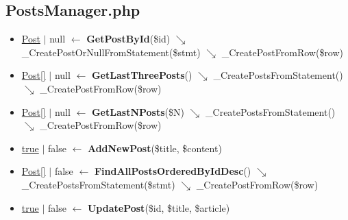 \subsection{PostsManager.php}
\begin{itemize}
  \setlength\itemsep{0em}
  \item \underline{Post} $\vert$ null $\leftarrow$ \textbf{GetPostById}(\$id) $\searrow$ \_CreatePostOrNullFromStatement(\$stmt) $\searrow$ \_CreatePostFromRow(\$row)
  \item \underline{Post[]} $\vert$ null $\leftarrow$ \textbf{GetLastThreePosts}() $\searrow$ \_CreatePostsFromStatement() $\searrow$ \_CreatePostFromRow(\$row)
  \item \underline{Post[]} $\vert$ null $\leftarrow$ \textbf{GetLastNPosts}(\$N) $\searrow$ \_CreatePostsFromStatement() $\searrow$ \_CreatePostFromRow(\$row)
  \item \underline{true} $\vert$ false $\leftarrow$ \textbf{AddNewPost}(\$title, \$content)
  \item \underline{Post[]} $\vert$ false $\leftarrow$ \textbf{FindAllPostsOrderedByIdDesc}() $\searrow$ \_CreatePostsFromStatement(\$stmt) $\searrow$ \_CreatePostFromRow(\$row)
  \item \underline{true} $\vert$ false $\leftarrow$ \textbf{UpdatePost}(\$id, \$title, \$article)
\end{itemize}
